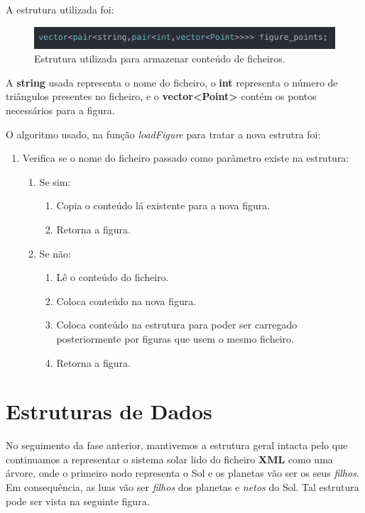 \documentclass[a4paper]{article}
\begin{document}
A estrutura utilizada foi: 

\begin{figure}[H]
\centering
\includegraphics[scale=0.6]{optimized_struct.png}
\caption{Estrutura utilizada para armazenar conteúdo de ficheiros.}
\label{img:optimized_struct}
\end{figure}

A \textbf{string} usada representa o nome do ficheiro, o \textbf{int} representa o número de triângulos presentes no ficheiro, e o \textbf{vector<Point>} contém os pontos necessários para a figura.

O algoritmo usado, na função \textit{loadFigure} para tratar a nova estrutra foi:

\ttfamily
\begin{enumerate}
  \item Verifica se o nome do ficheiro passado como parâmetro existe na estrutura:
  \begin{enumerate}
  	\item Se sim:
	\begin{enumerate}
		\item Copia o conteúdo lá existente para a nova figura.
		\item Retorna a figura.
	\end{enumerate}
	\item Se não:
	\begin{enumerate}
		\item Lê o conteúdo do ficheiro.
		\item Coloca conteúdo na nova figura.
		\item Coloca conteúdo na estrutura para poder ser carregado posteriormente por figuras que usem o mesmo ficheiro.
		\item Retorna a figura.
	 \end{enumerate}
  \end{enumerate}

\end{enumerate}
\rmfamily



\newpage

\section{Estruturas de Dados}
\label{sec:estruturasdados}

No seguimento da fase anterior, mantivemos a estrutura geral intacta pelo que continuamos a representar o sistema solar lido do ficheiro \textbf{XML} como uma árvore, onde o primeiro nodo representa o Sol e os planetas vão ser os seus \textit{filhos}. Em consequência, as luas vão ser \textit{filhos} dos planetas e \textit{netos} do Sol. Tal estrutura pode ser vista na seguinte figura.
\end{document}
